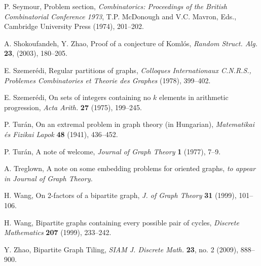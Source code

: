 \documentclass[oneside,12pt]{memoir}
\begin{document}
\begin{thebibliography}{99}

 P. Seymour, Problem section, \emph{Combinatorics: Proceedings of the British Combinatorial Conference 1973}, T.P. McDonough and V.C. Mavron, Eds., Cambridge University Press (1974), 201--202.

 A. Shokoufandeh, Y. Zhao, Proof of a conjecture of Koml\'{o}s, \emph{Random Struct. Alg.} \textbf{23}, (2003), 180--205. 

  E. Szemer\'{e}di, Regular partitions of graphs, \emph{
Colloques Internationaux C.N.R.S., Problemes Combinatories et Theorie des
Graphes} (1978), 399--402.

 E. Szemer\'edi, On sets of integers containing no $k$ elements in arithmetic progression, \emph{Acta Arith.}  \textbf{27} (1975), 199--245.

 P. Tur\'an, On an extremal problem in graph theory (in Hungarian), \emph{Matematikai \'es Fizikai Lapok} \textbf{48} (1941), 436--452.

 P. Tur\'an, A note of welcome, \emph{Journal of Graph Theory} \textbf{1} (1977), 7--9.

 A. Treglown, A note on some embedding problems for oriented graphs, \emph{to appear in Journal of Graph Theory.}

  H. Wang, On 2-factors of a bipartite graph, \emph{J. of Graph
Theory} \textbf{31} (1999), 101--106.

 H. Wang, Bipartite graphs containing every possible pair of cycles, \emph{Discrete Mathematics} \textbf{207} (1999), 233--242.

 Y. Zhao, Bipartite Graph Tiling, \emph{SIAM J. Discrete Math.} \textbf{23}, no. 2 (2009), 888--900.












\end{thebibliography}
\end{document}
